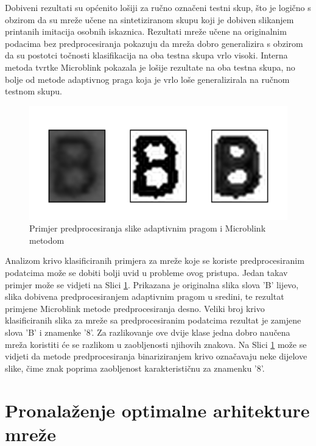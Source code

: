 \documentclass[lmodern, utf8, diplomski, numeric]{fer}
\begin{document}
Dobiveni rezultati su općenito lošiji za ručno označeni testni skup, što je logično s obzirom da su mreže učene na sintetiziranom skupu koji je dobiven slikanjem printanih imitacija osobnih iskaznica. Rezultati mreže učene na originalnim podacima bez predprocesiranja pokazuju da mreža dobro generalizira s obzirom da su postotci točnosti klasifikacija na oba testna skupa vrlo visoki. Interna metoda tvrtke Microblink pokazala je lošije rezultate na oba testna skupa, no bolje od metode adaptivnog praga koja je vrlo loše generalizirala na ručnom testnom skupu.   

\begin{figure}[ht!]
\centering
\includegraphics[width=13cm]{slike/preprocessing_comparison.png}
\caption{Primjer predprocesiranja slike adaptivnim pragom i Microblink metodom}
\label{fig:preproc}
\end{figure}

Analizom krivo klasificiranih primjera za mreže koje se koriste predprocesiranim podatcima može se dobiti bolji uvid u probleme ovog pristupa. Jedan takav primjer može se vidjeti na Slici \ref{fig:preproc}. Prikazana je originalna slika slova 'B' lijevo, slika dobivena predprocesiranjem adaptivnim pragom u sredini, te rezultat primjene Microblink metode predprocesiranja desno. Veliki broj krivo klasificiranih slika za mreže sa predprocesiranim podatcima rezultat je zamjene slova 'B' i znamenke '8'. Za razlikovanje ove dvije klase jedna dobro naučena mreža koristiti će se razlikom u zaobljenosti njihovih znakova. Na Slici \ref{fig:preproc} može se vidjeti da metode predprocesiranja binariziranjem krivo označavaju neke dijelove slike, čime znak poprima zaobljenost karakterističnu za znamenku '8'.




\section{Pronalaženje optimalne arhitekture mreže}
\end{document}
